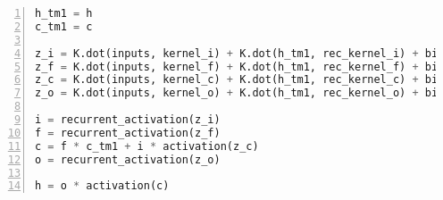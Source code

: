\noindent
\begin{algorithm}
\begin{lstlisting}[language=Python, frame=single, numbers=left, caption={Simplified version of Keras' LSTM implementation},label={alg:keraslstm}]
h_tm1 = h
c_tm1 = c

z_i = K.dot(inputs, kernel_i) + K.dot(h_tm1, rec_kernel_i) + bias_i
z_f = K.dot(inputs, kernel_f) + K.dot(h_tm1, rec_kernel_f) + bias_f
z_c = K.dot(inputs, kernel_c) + K.dot(h_tm1, rec_kernel_c) + bias_c
z_o = K.dot(inputs, kernel_o) + K.dot(h_tm1, rec_kernel_o) + bias_o

i = recurrent_activation(z_i)
f = recurrent_activation(z_f)
c = f * c_tm1 + i * activation(z_c)
o = recurrent_activation(z_o)

h = o * activation(c)
\end{lstlisting}
\end{algorithm}
